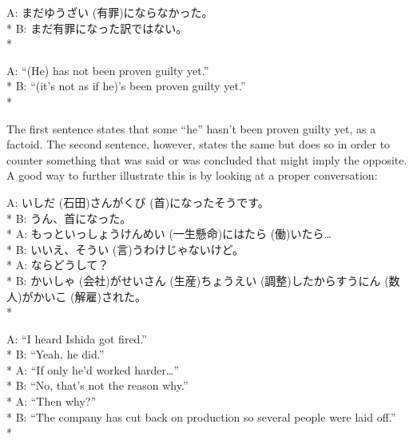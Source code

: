 \documentclass[11pt, b5paper, twoside, openright, onecolumn]{book}
\makeatletter
\newcommand*{\rubystack}[2]{{\relscale{0.5}%
  \begin{tabular}[b]{@{}c@{}}%
    {#1}\\%
   {\textscale{2}{#2}}%
  \end{tabular}}%
}
\DeclareRobustCommand*{\ruby}[2]{%
  \mbox{%
    \setlength{\parskip}{0ex}%
    \BeginAccSupp{method=pdfstringdef,ActualText={#1}}%
      \rubystack{\phantom{#2}}{#1}%
      \llap{%
        \rubystack{#2}{\phantom{#1}}%
      }%
    \EndAccSupp{}%
  }%
}
\renewcommand*{\ruby}[2]{#2 (#1)}%
\newenvironment{exampleblock}{
\setlength{\parindent}{0.6in}
\begin{minipage}[t]{\dimexpr\textwidth-\parindent}}
{\end{minipage}}
\makeatother
\begin{document}
\vspace{0.4cm}
\begin{exampleblock}
A: まだ\ruby{有罪}{ゆうざい}にならなかった。 \\* 
B: まだ有罪になった訳ではない。 \\* 
\end{exampleblock}
\vspace{0.2cm}

\begin{exampleblock}
A: “(He) has not been proven guilty yet.” \\* 
B: “(it’s not as if he)’s been proven guilty yet.” \\* 
\end{exampleblock}
\vspace{0.2cm}

The first sentence states that some “he” hasn’t been proven guilty yet‚ as a factoid. The second sentence‚ however‚ states the same but does so in order to counter something that was said or was concluded that might imply the opposite. A good way to further illustrate this is by looking at a proper conversation:

\vspace{0.4cm}
\begin{exampleblock}
A: \ruby{石田}{いしだ}さんが\ruby{首}{くび}になったそうです。 \\* 
B: うん、首になった。 \\* 
A: もっと\ruby{一生懸命}{いっしょうけんめい}に\ruby{働}{はたら}いたら… \\* 
B: いいえ、そう\ruby{言}{い}うわけじゃないけど。 \\* 
A: ならどうして？ \\* 
B: \ruby{会社}{かいしゃ}が\ruby{生産}{せいさん}\ruby{調整}{ちょうえい}したから\ruby{数人}{すうにん}が\ruby{解雇}{かいこ}された。 \\* 
\end{exampleblock}
\vspace{0.2cm}

\begin{exampleblock}
A: “I heard Ishida got fired.” \\* 
B: “Yeah‚ he did.” \\* 
A: “If only he’d worked harder…” \\* 
B: “No‚ that’s not the reason why.” \\* 
A: “Then why?” \\* 
B: “The company has cut back on production so several people were laid off.” \\* 
\end{exampleblock}
\vspace{0.2cm}
\end{document}
